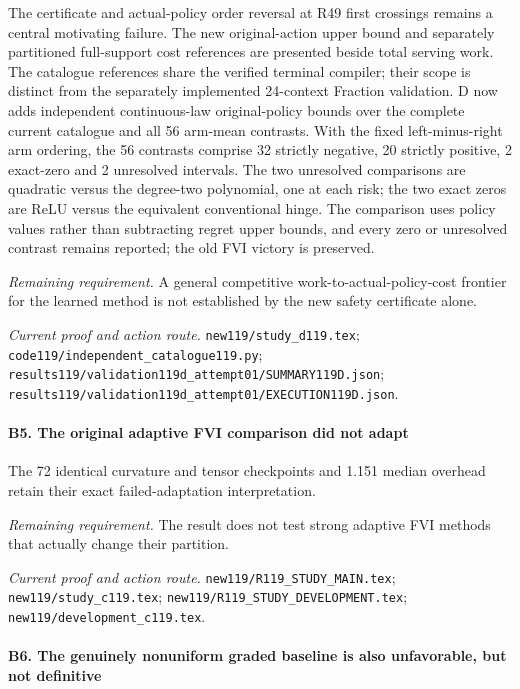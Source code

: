 The certificate and actual-policy order reversal at R49 first crossings remains a central motivating failure. The new original-action upper bound and separately partitioned full-support cost references are presented beside total serving work. The catalogue references share the verified terminal compiler; their scope is distinct from the separately implemented 24-context Fraction validation. D now adds independent continuous-law original-policy bounds over the complete current catalogue and all 56 arm-mean contrasts. With the fixed left-minus-right arm ordering, the 56 contrasts comprise 32 strictly negative, 20 strictly positive, 2 exact-zero and 2 unresolved intervals. The two unresolved comparisons are quadratic versus the degree-two polynomial, one at each risk; the two exact zeros are ReLU versus the equivalent conventional hinge. The comparison uses policy values rather than subtracting regret upper bounds, and every zero or unresolved contrast remains reported; the old FVI victory is preserved.

\par\emph{Remaining requirement.} A general competitive work-to-actual-policy-cost frontier for the learned method is not established by the new safety certificate alone.

\par\emph{Current proof and action route.} \nolinkurl{new119/study_d119.tex}; \nolinkurl{code119/independent_catalogue119.py}; \nolinkurl{results119/validation119d_attempt01/SUMMARY119D.json}; \nolinkurl{results119/validation119d_attempt01/EXECUTION119D.json}.

\paragraph{B5. The original adaptive FVI comparison did not adapt}

The 72 identical curvature and tensor checkpoints and 1.151 median overhead retain their exact failed-adaptation interpretation.

\par\emph{Remaining requirement.} The result does not test strong adaptive FVI methods that actually change their partition.

\par\emph{Current proof and action route.} \nolinkurl{new119/R119_STUDY_MAIN.tex}; \nolinkurl{new119/study_c119.tex}; \nolinkurl{new119/R119_STUDY_DEVELOPMENT.tex}; \nolinkurl{new119/development_c119.tex}.

\paragraph{B6. The genuinely nonuniform graded baseline is also unfavorable, but not definitive}

